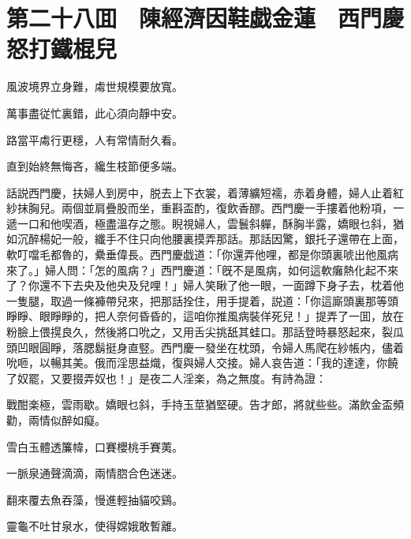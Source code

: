 
\chapter*{第二十八囬　陳經濟因鞋戯金蓮　西門慶怒打鐵棍兒}

風波境界立身難，䖏世規模要放寬。

萬事盡従忙裏錯，此心須向靜中安。

路當平䖏行更穩，人有常情耐久看。

直到始終無悔吝，纔生枝節便多端。

話説西門慶，扶婦人到房中，脱去上下衣裳，着薄纊短襦，赤着身體，婦人止着紅紗抹胸兒。兩個並肩疊股而坐，重斟盃酌，復飲香醪。西門慶一手摟着他粉項，一遞一口和他喫酒，極盡溫存之態。睨視婦人，雲鬟斜軃，酥胸半露，嬌眼乜斜，猶如沉醉楊妃一般，纖手不住只向他腰裏摸弄那話。那話因驚，銀托子還帶在上面，軟叮噹毛都魯的，纍垂偉長。西門慶戯道：「你還弄他哩，都是你頭裏唬出他風病來了。」婦人問：「怎的風病？」西門慶道：「旣不是風病，如何這軟癱熱化起不來了？你還不下去央及他央及兒哩！」婦人笑瞅了他一眼，一面蹲下身子去，枕着他一隻腿，取過一條褲帶兒來，把那話拴住，用手提着，説道：「你這廝頭裏那等頭睜睜、眼睜睜的，把人奈何昏昏的，這咱你推風病裝佯死兒！」提弄了一囬，放在粉臉上偎㨪良久，然後將口吮之，又用舌尖挑舐其蛙口。那話登時暴怒起來，裂瓜頭凹眼圓睜，落腮鬍挺身直竪。西門慶一發坐在枕頭，令婦人馬爬在紗帳内，儘着吮咂，以暢其美。俄而淫思益熾，復與婦人交接。婦人哀告道：「我的達達，你饒了奴罷，又要掇弄奴也！」是夜二人淫楽，為之無度。有詩為證：

戰酣楽極，雲雨歇。嬌眼乜斜，手持玉莖猶堅硬。告才郎，將就些些。滿飲金盃頻勸，兩情似醉如癡。

雪白玉體透簾幃，口賽櫻桃手賽荑。

一脈泉通聲滴滴，兩情脗合色迷迷。

翻來覆去魚吞藻，慢進輕抽貓咬鷄。

靈龜不吐甘泉水，使得嫦娥敢暫離。

